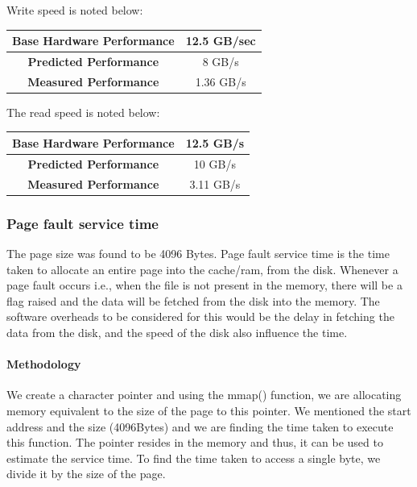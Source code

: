 \documentclass[conference]{IEEEtran}
\begin{document}
Write speed is noted below:
\begin{center}
\begin{tabular}{ |c|c| } 
  \hline
  \textbf{Base Hardware Performance} & 12.5 GB/sec \\ 
  \hline
  \textbf{Predicted Performance} & 8 GB/s \\ 
  \hline
  \textbf{Measured Performance} & 1.36 GB/s \\ 
  \hline
\end{tabular}
\end{center}

The read speed is noted below:

\begin{center}
\begin{tabular}{ |c|c| } 
  \hline
  \textbf{Base Hardware Performance} & 12.5 GB/s \\ 
  \hline
  \textbf{Predicted Performance} & 10 GB/s \\ 
  \hline
  \textbf{Measured Performance} & 3.11 GB/s \\ 
  \hline
\end{tabular}
\end{center}





\subsubsection{Page fault service time}

The page size was found to be 4096 Bytes. Page fault service time is the  time taken to allocate an entire page into the cache/ram, from the disk. Whenever a page fault occurs i.e., when the file is not present in the memory, there will be a flag raised and the data will be fetched from the disk into the memory. The software overheads to be considered for this would be the delay in fetching the data from the disk, and the speed of the disk also influence the time.




\paragraph{Methodology}


We create a character pointer and using the mmap() function, we are allocating memory equivalent to the size of the page to this pointer. We mentioned the start address and the size (4096Bytes) and we are finding the time taken to execute this function. The pointer resides in the memory and thus, it can be used to estimate the service time.
To find the time taken to access a single byte, we divide it by the size of the page.
\end{document}
